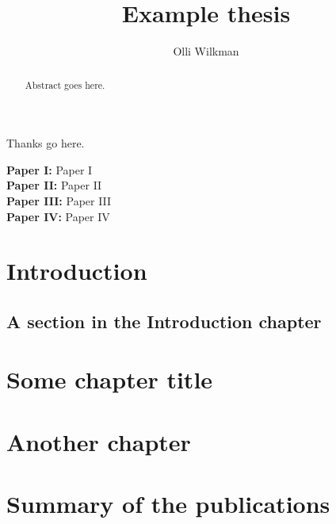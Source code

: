 \documentclass[11pt,english]{report}
\title{Example thesis}
\author{Olli Wilkman}
\begin{document}
\frontmatter

\maketitle

\begin{abstract}
	Abstract goes here.
\end{abstract}

\begin{acknowledgements}
	Thanks go here.
\end{acknowledgements}

\begin{publications}
	\textbf{Paper I:} Paper I \\
	\newline
	\textbf{Paper II:} Paper II \\
	\newline
	\textbf{Paper III:} Paper III \\
	\newline
	\textbf{Paper IV:} Paper IV
\end{publications}

\pagestyle{headings}
\tableofcontents


\mainmatter

\chapter{Introduction}

\section{A section in the Introduction chapter}

\chapter{Some chapter title}


\chapter{Another chapter}



\chapter{Summary of the publications}
\end{document}

